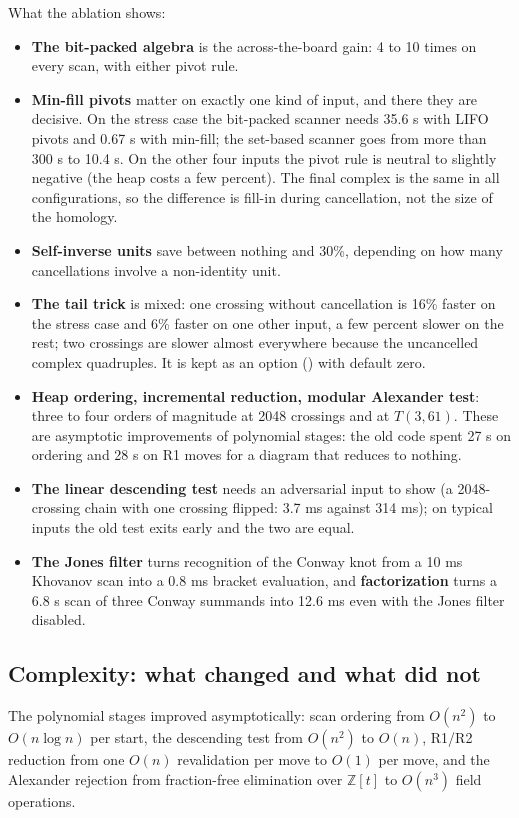 What the ablation shows:
\begin{itemize}
\item \textbf{The bit-packed algebra} is the across-the-board gain: 4 to 10
  times on every scan, with either pivot rule.
\item \textbf{Min-fill pivots} matter on exactly one kind of input, and there
  they are decisive. On the stress case the bit-packed scanner needs 35.6 s
  with LIFO pivots and 0.67 s with min-fill; the set-based scanner goes from
  more than 300 s to 10.4 s. On the other four inputs the pivot rule is
  neutral to slightly negative (the heap costs a few percent). The final
  complex is the same in all configurations, so the difference is fill-in
  during cancellation, not the size of the homology.
\item \textbf{Self-inverse units} save between nothing and 30\%, depending on
  how many cancellations involve a non-identity unit.
\item \textbf{The tail trick} is mixed: one crossing without cancellation is
  16\% faster on the stress case and 6\% faster on one other input, a few
  percent slower on the rest; two crossings are slower almost everywhere
  because the uncancelled complex quadruples. It is kept as an option
  () with default zero.
\item \textbf{Heap ordering, incremental reduction, modular Alexander test}:
  three to four orders of magnitude at 2048 crossings and at $T(3,61)$. These
  are asymptotic improvements of polynomial stages: the old code spent 27 s on
  ordering and 28 s on R1 moves for a diagram that reduces to nothing.
\item \textbf{The linear descending test} needs an adversarial input to show
  (a 2048-crossing chain with one crossing flipped: 3.7 ms against 314 ms);
  on typical inputs the old test exits early and the two are equal.
\item \textbf{The Jones filter} turns recognition of the Conway knot from a
  10 ms Khovanov scan into a 0.8 ms bracket evaluation, and
  \textbf{factorization} turns a 6.8 s scan of three Conway summands into
  12.6 ms even with the Jones filter disabled.
\end{itemize}

\subsection{Complexity: what changed and what did not}
The polynomial stages improved asymptotically: scan ordering from $O(n^2)$ to
$O(n\log n)$ per start, the descending test from $O(n^2)$ to $O(n)$, R1/R2
reduction from one $O(n)$ revalidation per move to $O(1)$ per move, and the
Alexander rejection from fraction-free elimination over $\mathbb Z[t]$ to
$O(n^3)$ field operations.

